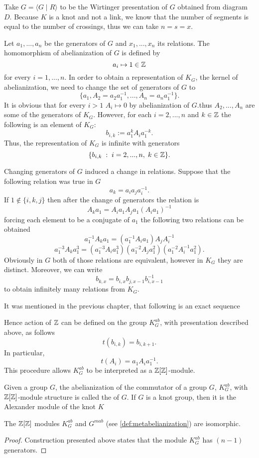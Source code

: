 Take $G=\langle G\;|\;R\rangle$ to be the Wirtinger presentation of $G$ obtained from diagram $D$. Because $K$ is a knot and not a link, we know that the number of segments is equal to the number of crossings, thus we can take $n=s=x$.

Let $a_1,...,a_n$ be the generators of $G$ and $x_1,...,x_n$ its relations. The homomorphism of abelianization of $G$ is defined by 
$$a_i\mapsto 1\in\operatorname{\mathbb{Z}}$$ 
for every $i=1,...,n$. In order to obtain a representation of $K_G$, the kernel of abelianization, we need to change the set of generators of $G$ to 
$$\{a_1, A_2=a_2a_1^{-1},..., A_n=a_na_1^{-1}\}.$$
It is obvious that for every $i>1$ $A_i\mapsto0$ by abelianization of $G$.thus $A_2,...,A_n$ are some of the generators of $K_G$. However, for each $i=2,...,n$ and $k\in\operatorname{\mathbb{Z}}$ the following is an element of $K_G$:
$$b_{i, k}:=a_1^k A_i a_1^{-k}.$$
Thus, the representation of $K_G$ is infinite with generators 
$$\{b_{i,k}\;:\;i=2,...,n,\;k\in\operatorname{\mathbb{Z}}\}.$$

Changing generators of $G$ induced a change in relations. Suppose that the following relation was true in $G$
$$a_k=a_ia_ja_i^{-1}.$$
If $1\notin\{i,k,j\}$ then after the change of generators the relation is
$$ A_ka_1 = A_ia_1 A_ja_1 (A_ia_1)^{-1}
$$
forcing each element to be a conjugate of $a_1$ the following two relations can be obtained
$$ a_1^{-1}A_ka_1=(a_1^{-1} A_i a_1)A_jA_i^{-1}
$$
$$
a_1^{-3} A_k a_1^3 = (a_1^{-3} A_i a_1^3) (a_1^{-2} A_j a_1^2) (a_1^{-2} A_i^{-1} a_1^2).
$$
Obviously in $G$ both of those relations are equivalent, however in $K_G$ they are distinct. Moreover, we can write 
$$
b_{k, x}=b_{i, x}b_{j, x-1}b_{i, x-1}^{-1}
$$
to obtain infinitely many relations from $K_G$.

It was mentioned in the previous chapter, that following is an exact sequence
\begin{center}
\end{center}
Hence action of $\operatorname{\mathbb{Z}}$ can be defined on the group $K^{ab}_G$, with presentation described above, as follows 
$$t(b_{i, k})=b_{i, k+1}.$$
In particular, 
$$t(A_i)=a_1 A_i a_1^{-1}.$$
This procedure allows $K_G^{ab}$ to be interpreted as a $\operatorname{\mathbb{Z}}[\operatorname{\mathbb{Z}}]$-module.

\begin{definition}
  Given a group $G$, the abelianization of the commutator of a group $G$, $K_G^{ab}$, with $\operatorname{\mathbb{Z}}[\operatorname{\mathbb{Z}}]$-module structure is called the  of $G$. If $G$ is a knot group, then it is the Alexander module of the knot $K$
\end{definition}

{\color{blue}
\begin{lemma}
  The $\operatorname{\mathbb{Z}}[\operatorname{\mathbb{Z}}]$ modules $K_G^{ab}$ and $G^{mab}$ (see \cref{def:metabelianization}) are isomorphic.
\end{lemma}

\begin{proof}
  Construction presented above states that the module $K_G^{ab}$ has $(n-1)$ generators.
\end{proof}
}





